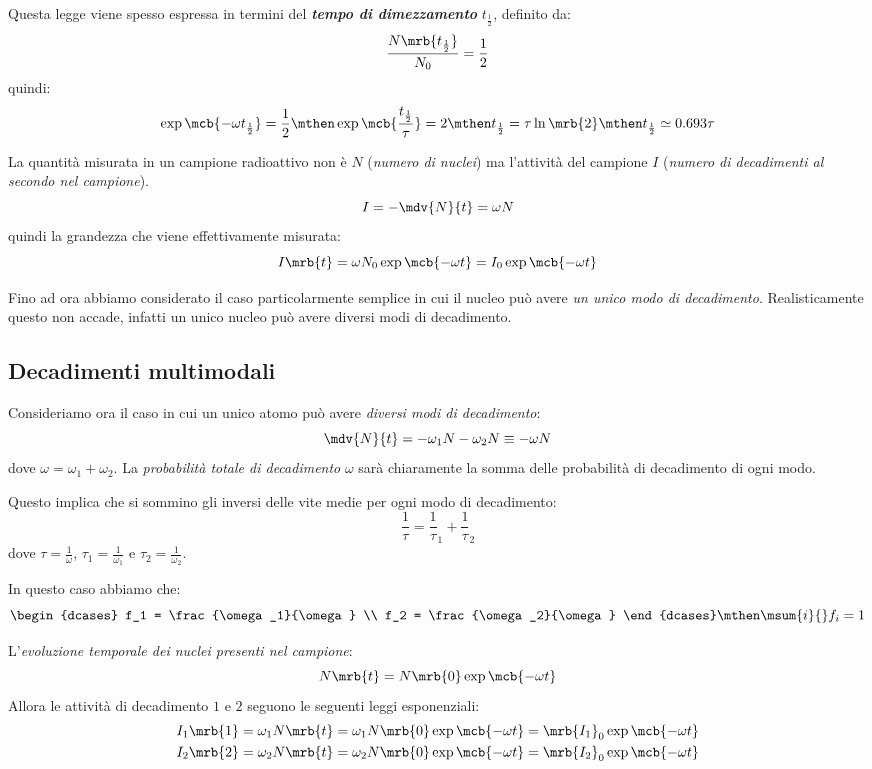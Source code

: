Questa legge viene spesso espressa in termini del \textit{\textbf{tempo di
dimezzamento}} $t_{\frac{1}{2}}$, definito da:
\[
  \frac{N \mrb{t_{\frac{1}{2}}}}{N_0} = \frac{1}{2}
\]
quindi:
\[
  \exp \mcb{- \omega t _{\frac{1}{2}}} = \frac{1}{2}
  \mthen
  \exp \mcb{\frac{t _{\frac{1}{2}}}{\tau}} = 2
  \mthen
  t _{\frac{1}{2}} = \tau \ln \mrb{2}
  \mthen
  t _{\frac{1}{2}} \simeq 0.693\tau 
\]

\begin{note}[]
  La quantità misurata in un campione radioattivo non è $N$ (\textit{numero di
  nuclei}) ma l'attività del campione $I$ (\textit{numero di decadimenti al
  secondo nel campione}).
  \[
    I = - \mdv{N}{t} = \omega N
  \]
  quindi la grandezza che viene effettivamente misurata:
  \[
    I \mrb{t} = \omega N_0 \exp \mcb{- \omega t} = I _{0} \exp \mcb{- \omega t}
  \]

\end{note}

Fino ad ora abbiamo considerato il caso particolarmente semplice in cui il
nucleo può avere \textit{un unico modo di decadimento}. Realisticamente questo
non accade, infatti un unico nucleo può avere diversi modi di decadimento.

\subsection{Decadimenti multimodali}
Consideriamo ora il caso in cui un unico atomo può avere \textit{diversi modi
di decadimento}:
\[
  \mdv{N}{t} = - \omega_1 N - \omega_2 N \equiv - \omega N
\]
dove $\omega = \omega_1 + \omega_2$. La \textit{probabilità totale di
decadimento} $\omega$ sarà chiaramente la somma delle probabilità di
decadimento di ogni modo.

Questo implica che si sommino gli inversi delle vite medie per ogni modo di
decadimento:
\[
  \frac{1}{\tau} = \frac{1}{\tau}_{1} + \frac{1}{\tau}_{2}
\]
dove $\tau = \frac{1}{\omega}$, $\tau_1 = \frac{1}{\omega_1}$ e $\tau_2 =
\frac{1}{\omega_2}$.

In questo caso abbiamo che:
\[
  \begin{dcases}
    f_1 = \frac{\omega_1}{\omega}
    \\
    f_2 = \frac{\omega_2}{\omega}
  \end{dcases}
  \mthen
  \msum{i}{} f_i = 1
\]

L'\textit{evoluzione temporale dei nuclei presenti nel campione}:
\[
  N \mrb{t} = N \mrb{0} \exp \mcb{- \omega t}
\]
Allora le attività di decadimento $1$ e $2$ seguono le seguenti leggi
esponenziali:
\begin{align*}
  I_1 \mrb{1} = \omega_1 N \mrb{t} = \omega _{1} N \mrb{0} \exp \mcb{-\omega t}
  = \mrb{I_1}_{0} \exp \mcb{- \omega t}
  \\
  I_2 \mrb{2} = \omega_2 N \mrb{t} = \omega _{2} N \mrb{0} \exp \mcb{-\omega t}
  = \mrb{I_2}_{0} \exp \mcb{- \omega t}
\end{align*}
